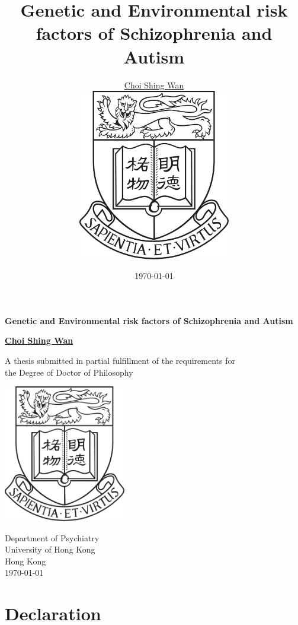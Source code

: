 \documentclass{book}
\title{Genetic and Environmental risk factors of Schizophrenia and Autism}
\date{\today}
\author{\href{mailto:choishingwan@gmail.com}{Choi Shing Wan}\\
	\includegraphics[width=0.5\textwidth]{hkuLogo.jpg}}
\begin{document}
\thispagestyle{empty}
\pagestyle{empty}

\begin{titlepage}
	\begin{center}
		\vspace*{1cm}
		
		\Huge
		\textbf{Genetic and Environmental risk factors of Schizophrenia and Autism}
		
		\vspace{0.5cm}
		\LARGE
		
		\vspace{1.5cm}
		
		\textbf{\href{mailto:choishingwan@gmail.com}{Choi Shing Wan}}
		
		\vfill
		
		A thesis submitted in partial fulfillment of the requirements for \\
		the Degree of Doctor of Philosophy
		
		\vspace{0.8cm}
		
		\includegraphics[width=0.4\textwidth]{hkuLogo.jpg}
		
		\Large
		Department of Psychiatry\\
		University of Hong Kong\\
		Hong Kong\\
		\today
		
	\end{center}
\end{titlepage}


\frontmatter 

	\cleardoublepage
	\chapter*{Declaration}
	\cleardoublepage
\end{document}
